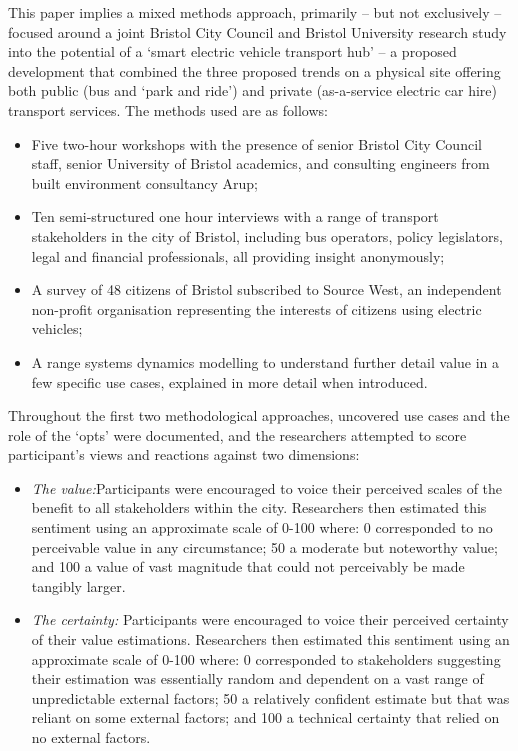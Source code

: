 \documentclass[journal]{IEEEtran}
\begin{document}
This paper implies a mixed methods approach, primarily – but not
exclusively -- focused around a joint Bristol City Council and Bristol
University research study into the potential of a `smart electric
vehicle transport hub' -- a proposed development that combined the
three proposed trends on a physical site offering both public (bus and
`park and ride') and private (as-a-service electric car hire)
transport services. The methods used are as follows:

\begin{itemize}
\item Five two-hour workshops with the presence of senior Bristol City
Council staff, senior University of Bristol academics, and consulting
engineers from built environment consultancy Arup;
\item Ten semi-structured one hour interviews with a range of
transport stakeholders in the city of Bristol, including bus
operators, policy legislators, legal and financial professionals, all
providing insight anonymously;
\item A survey of 48 citizens of Bristol subscribed to Source West, an
independent non-profit organisation representing the interests of
citizens using electric vehicles;
\item A range systems dynamics modelling to understand further detail
  value in a few specific use cases, explained in more detail when
  introduced.
\end{itemize}

Throughout the first two methodological approaches, uncovered use
cases and the role of the `opts' were documented, and the researchers
attempted to score participant's views and reactions against two
dimensions:

\begin{itemize}
\item {\emph{The value:}}Participants were encouraged to voice their
perceived scales of the benefit to all stakeholders within the
city. Researchers then estimated this sentiment using an approximate
scale of 0-100 where: 0 corresponded to no perceivable value in any
circumstance; 50 a moderate but noteworthy value; and 100 a value of
vast magnitude that could not perceivably be made tangibly larger.
\item {\emph{The certainty:}} Participants were encouraged to voice
their perceived certainty of their value estimations. Researchers then
estimated this sentiment using an approximate scale of 0-100 where: 0
corresponded to stakeholders suggesting their estimation was
essentially random and dependent on a vast range of unpredictable
external factors; 50 a relatively confident estimate but that was
reliant on some external factors; and 100 a technical certainty that
relied on no external factors.
\end{itemize}
\end{document}
